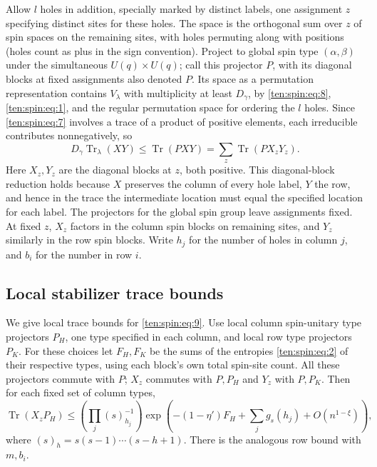 Allow \(l\) holes in addition, specially marked by distinct labels, one assignment \(z\) specifying distinct sites for these holes. The space is the orthogonal sum over \(z\) of spin spaces on the remaining sites, with holes permuting along with positions (holes count as plus in the sign convention). Project to global spin type \((\alpha,\beta)\) under the simultaneous \(U(q)\times U(q)\); call this projector \(P\), with its diagonal blocks at fixed assignments also denoted \(P\). Its space as a permutation representation contains \(V_\lambda\) with multiplicity at least \(D_\gamma\), by \eqref{ten:spin:eq:8}, \eqref{ten:spin:eq:1}, and the regular permutation space for ordering the \(l\) holes. Since \eqref{ten:spin:eq:7} involves a trace of a product of positive elements, each irreducible contributes nonnegatively, so
\begin{equation}
 D_\gamma \operatorname{Tr}_\lambda(XY)
 \le \operatorname{Tr}(PXY)
 =\sum_z \operatorname{Tr}(P X_z Y_z).
 \label{ten:spin:eq:9}
\end{equation}
Here \(X_z,Y_z\) are the diagonal blocks at \(z\), both positive. This diagonal-block reduction holds because \(X\) preserves the column of every hole label, \(Y\) the row, and hence in the trace the intermediate location must equal the specified location for each label. The projectors for the global spin group leave assignments fixed. At fixed \(z\), \(X_z\) factors in the column spin blocks on remaining sites, and \(Y_z\) similarly in the row spin blocks. Write \(h_j\) for the number of holes in column \(j\), and \(b_i\) for the number in row \(i\).

\subsection{Local stabilizer trace bounds}
We give local trace bounds for \eqref{ten:spin:eq:9}. Use local column spin-unitary type projectors \(P_H\), one type specified in each column, and local row type projectors \(P_K\). For these choices let \(F_H,F_K\) be the sums of the entropies \eqref{ten:spin:eq:2} of their respective types, using each block's own total spin-site count. All these projectors commute with \(P\); \(X_z\) commutes with \(P,P_H\) and \(Y_z\) with \(P,P_K\).
Then for each fixed set of column types,
\begin{equation}
 \operatorname{Tr}(X_z P_H)
 \le
 \left(\prod_j(s)_{h_j}^{-1}\right)
 \exp\left(-(1-\eta')F_H+\sum_j g_s(h_j)+O(n^{1-\xi})\right),
 \label{ten:spin:eq:10}
\end{equation}
where \((s)_h=s(s-1)\cdots(s-h+1)\). There is the analogous row bound with \(m,b_i\).

